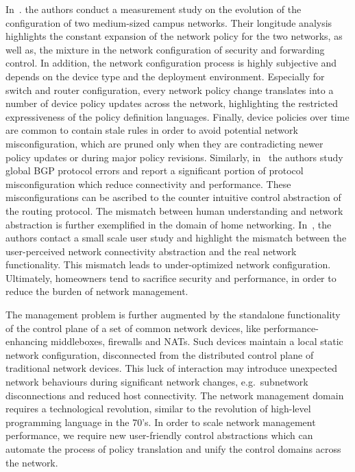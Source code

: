 In~\cite{Kim11}. the authors conduct a measurement study on the evolution of the
configuration of two medium-sized campus networks. Their longitude analysis
highlights the constant expansion of the network policy for the two networks, as
well as, the mixture in the network configuration of security and forwarding
control.  In addition, the network configuration process is highly subjective
and depends on the device type and the deployment environment.  Especially for
switch and router configuration, every network policy change translates into a
number of device policy updates across the network, highlighting the restricted
expressiveness of the policy definition languages.  Finally, device policies
over time are common to contain stale rules in order to avoid potential network
misconfiguration, which are pruned only when they are contradicting newer policy
updates or during major policy revisions.  Similarly, in~\cite{Mahajan02} the
authors study global BGP protocol errors and report a significant portion of
protocol misconfiguration which reduce connectivity and performance. These
misconfigurations can be ascribed to the counter intuitive control abstraction
of the routing protocol.  The mismatch between human understanding and network
abstraction is further exemplified in the domain of home networking.
In~\cite{grinter05}, the authors contact a small scale user study and highlight
the mismatch between the user-perceived network connectivity abstraction and the
real network functionality. This mismatch leads to under-optimized network
configuration. Ultimately, homeowners tend to sacrifice security and
performance, in order to reduce the burden of network management. 

The management problem is further augmented by the standalone functionality of
the control plane of a set of common network devices, like performance-enhancing
middleboxes, firewalls and NATs. Such devices maintain a local static network
configuration, disconnected from the distributed control plane of traditional
network devices.  This luck of interaction may introduce unexpected network
behaviours during significant network changes, e.g.~subnetwork disconnections
and reduced host connectivity.  The network management domain requires a
technological revolution, similar to the revolution of high-level programming
language in the 70's.  In order to scale network management performance, we
require new user-friendly control abstractions which can automate the process of
policy translation and unify the control domains across the network. 

